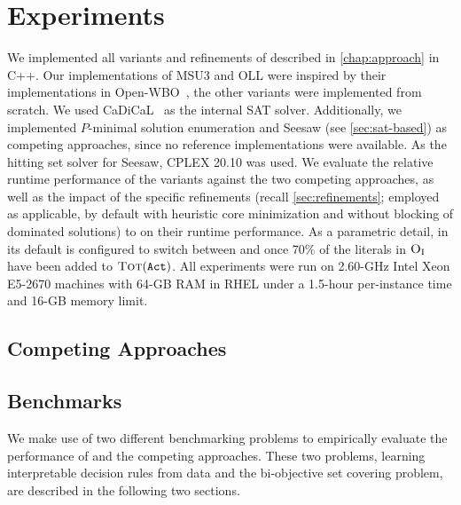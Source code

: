 \chapter{Experiments\label{chap:experiments}}

We implemented  all variants and refinements of \algname{} described in \cref{chap:approach} in C++.
Our implementations of MSU3 and OLL were inspired by their implementations in Open-WBO~\autocite{DBLP:conf/sat/MartinsML14}, the other variants were implemented from scratch.
We used CaDiCaL~\autocite{BiereFazekasFleuryHeisinger-SAT-Competition-2020-solvers} as the internal SAT solver.
Additionally, we implemented $P$-minimal solution enumeration and Seesaw (see \cref{sec:sat-based}) as competing approaches, since no reference implementations were available.
As the hitting set solver for Seesaw, CPLEX 20.10 was used.
We evaluate the relative runtime performance of the \algname{} variants against the two competing approaches, as well as the impact of the specific refinements (recall \cref{sec:refinements}; employed as applicable, by default with heuristic core minimization and without blocking of dominated solutions) to \algname{} on their runtime performance.
As a parametric detail, in its default \msh{} is configured to switch between \msu{} and \satunsat{} once 70\% of the literals in $\textsc{O}_{\text{I}}$ have been added to $\textsc{Tot}(\texttt{Act})$.
All experiments were run on 2.60-GHz Intel Xeon E5-2670 machines with 64-GB RAM in RHEL under a 1.5-hour per-instance time and 16-GB memory limit.

\section{Competing Approaches\label{sec:competing}}


\section{Benchmarks\label{sec:benchmarks}}

We make use of two different benchmarking problems to empirically evaluate the performance of \algname{} and the competing approaches.
These two problems, learning interpretable decision rules from data and the bi-objective set covering problem, are described in the following two sections.

